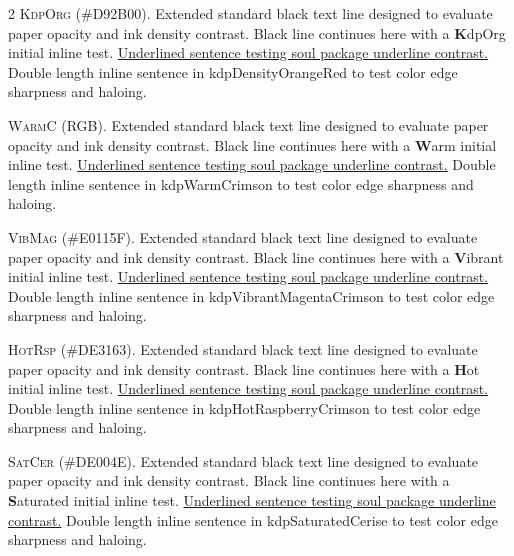 \documentclass[9pt]{article}
\let\oldlettrine\lettrine
\renewcommand{\lettrine}[3][]{%
	\clubpenalty=10000
	\oldlettrine[#1]{#2}{#3}%
}
\begin{document}
\begin{multicols}{2}
\lettrine[lines=2]{\textcolor{kdpDensityOrangeRed}{K}}{dpOrg} (\#D92B00). Extended standard black text line designed to evaluate paper opacity and ink density contrast. Black line continues here with a \textbf{\textcolor{kdpDensityOrangeRed}{K}}dpOrg initial inline test. \ul{Underlined sentence testing soul package underline contrast.} \textcolor{kdpDensityOrangeRed}{Double length inline sentence in kdpDensityOrangeRed to test color edge sharpness and haloing.}
\medskip

\lettrine[lines=2]{\textcolor{kdpWarmCrimson}{W}}{armC} (RGB). Extended standard black text line designed to evaluate paper opacity and ink density contrast. Black line continues here with a \textbf{\textcolor{kdpWarmCrimson}{W}}arm initial inline test. \ul{Underlined sentence testing soul package underline contrast.} \textcolor{kdpWarmCrimson}{Double length inline sentence in kdpWarmCrimson to test color edge sharpness and haloing.}
\medskip

\lettrine[lines=2]{\textcolor{kdpVibrantMagentaCrimson}{V}}{ibMag} (\#E0115F). Extended standard black text line designed to evaluate paper opacity and ink density contrast. Black line continues here with a \textbf{\textcolor{kdpVibrantMagentaCrimson}{V}}ibrant initial inline test. \ul{Underlined sentence testing soul package underline contrast.} \textcolor{kdpVibrantMagentaCrimson}{Double length inline sentence in kdpVibrantMagentaCrimson to test color edge sharpness and haloing.}
\medskip

\lettrine[lines=2]{\textcolor{kdpHotRaspberryCrimson}{H}}{otRsp} (\#DE3163). Extended standard black text line designed to evaluate paper opacity and ink density contrast. Black line continues here with a \textbf{\textcolor{kdpHotRaspberryCrimson}{H}}ot initial inline test. \ul{Underlined sentence testing soul package underline contrast.} \textcolor{kdpHotRaspberryCrimson}{Double length inline sentence in kdpHotRaspberryCrimson to test color edge sharpness and haloing.}
\medskip

\lettrine[lines=2]{\textcolor{kdpSaturatedCerise}{S}}{atCer} (\#DE004E). Extended standard black text line designed to evaluate paper opacity and ink density contrast. Black line continues here with a \textbf{\textcolor{kdpSaturatedCerise}{S}}aturated initial inline test. \ul{Underlined sentence testing soul package underline contrast.} \textcolor{kdpSaturatedCerise}{Double length inline sentence in kdpSaturatedCerise to test color edge sharpness and haloing.}
\medskip


\end{multicols}
\end{document}
